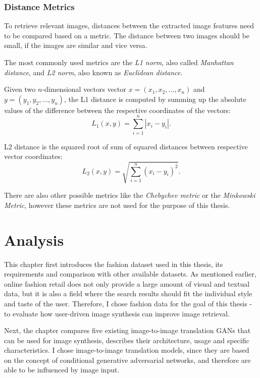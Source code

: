 \documentclass[12pt]{report}
\begin{document}
\pagebreak
\subsection{Distance Metrics}
To retrieve relevant images, distances between the extracted image features need to be compared based on a metric. The distance between two images should be small, if the images are similar and vice versa. 

The most commonly used metrics are the \textit{L1 norm}, also called \textit{Manhattan distance}, and \textit{L2 norm}, also known as \textit{Euclidean distance}.

Given two $n$-dimensional vectors vector $x = (x_1, x_2, ..., x_n)$ and $y = (y_1, y_2, ..., y_n)$, the L1 distance is computed by summing up the absolute values of the difference between the respective coordinates of the vectors:
\begin{equation}
L_1(x, y) = \sum_{i=1}^{n} |x_i - y_i|.
\end{equation} 

L2 distance is the squared root of sum of squared distances between respective vector coordinates:
\begin{equation}
L_2(x, y) = \sqrt{\sum_{i=1}^{n} (x_i - y_i)^2}.
\end{equation}

There are also other possible metrics like the \textit{Chebychev metric} or the \textit{Minkowski Metric}, however these metrics are not used for the purpose of this thesis. 


\pagebreak
\chapter{Analysis}
This chapter first introduces the fashion dataset used in this thesis, its requirements and comparison with other available datasets. As mentioned earlier, online fashion retail does not only provide a large amount of visual and textual data, but it is also a field where the search results should fit the individual style and taste of the user. Therefore, I chose fashion data for the goal of this thesis - to evaluate how user-driven image synthesis can improve image retrieval.

Next, the chapter compares five existing image-to-image translation GANs that can be used for image synthesis, describes their architecture, usage and specific characteristics. I chose image-to-image translation models, since they are based on the concept of conditional generative adversarial networks, and therefore are able to be influenced by image input.
\end{document}
